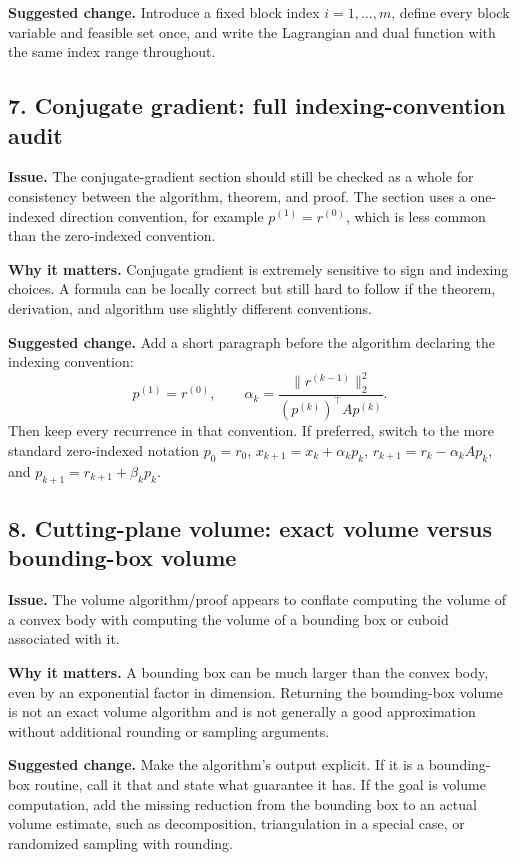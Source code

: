 \documentclass[11pt]{article}
\begin{document}
\textbf{Suggested change.}  Introduce a fixed block index \(i=1,\ldots,m\), define every block variable and feasible set once, and write the Lagrangian and dual function with the same index range throughout.

\subsection*{7. Conjugate gradient: full indexing-convention audit}

\textbf{Issue.}  The conjugate-gradient section should still be checked as a whole for consistency between the algorithm, theorem, and proof.  The section uses a one-indexed direction convention, for example \(p^{(1)}=r^{(0)}\), which is less common than the zero-indexed convention.

\textbf{Why it matters.}  Conjugate gradient is extremely sensitive to sign and indexing choices.  A formula can be locally correct but still hard to follow if the theorem, derivation, and algorithm use slightly different conventions.

\textbf{Suggested change.}  Add a short paragraph before the algorithm declaring the indexing convention:
\[
p^{(1)}=r^{(0)},\qquad
\alpha_k=\frac{\|r^{(k-1)}\|_2^2}{(p^{(k)})^\top A p^{(k)}}.
\]
Then keep every recurrence in that convention.  If preferred, switch to the more standard zero-indexed notation \(p_0=r_0\), \(x_{k+1}=x_k+\alpha_k p_k\), \(r_{k+1}=r_k-\alpha_k A p_k\), and \(p_{k+1}=r_{k+1}+\beta_k p_k\).

\subsection*{8. Cutting-plane volume: exact volume versus bounding-box volume}

\textbf{Issue.}  The volume algorithm/proof appears to conflate computing the volume of a convex body with computing the volume of a bounding box or cuboid associated with it.

\textbf{Why it matters.}  A bounding box can be much larger than the convex body, even by an exponential factor in dimension.  Returning the bounding-box volume is not an exact volume algorithm and is not generally a good approximation without additional rounding or sampling arguments.

\textbf{Suggested change.}  Make the algorithm's output explicit.  If it is a bounding-box routine, call it that and state what guarantee it has.  If the goal is volume computation, add the missing reduction from the bounding box to an actual volume estimate, such as decomposition, triangulation in a special case, or randomized sampling with rounding.
\end{document}
